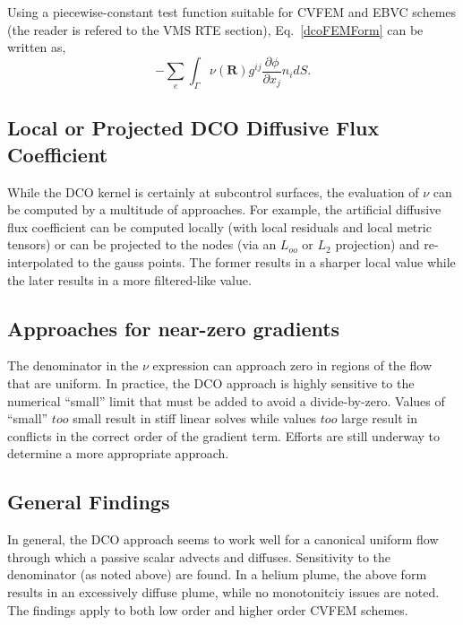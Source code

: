 Using a piecewise-constant test function suitable for CVFEM and EBVC schemes (the reader is refered to the VMS RTE section), 
Eq.~\ref{dcoFEMForm} can be written as,
\begin{equation}
  -\sum_e \int_\Gamma \nu(\mathbf{R}) g^{ij} \frac{\partial \phi} {\partial x_j} n_i dS.
\label{dcoFVForm}
\end{equation}

\subsection{Local or Projected DCO Diffusive Flux Coefficient}
While the DCO kernel is certainly at subcontrol surfaces, the evaluation of $\nu$ can be computed by a multitude of
approaches. For example, the artificial diffusive flux coefficient can be computed locally (with local residuals and local metric tensors)
or can be projected to the nodes (via an $L_{oo}$ or $L_2$ projection) and re-interpolated to the gauss points. The former results 
in a sharper local value while the later results in a more filtered-like value.

\subsection{Approaches for near-zero gradients}
The denominator in the $\nu$ expression can approach zero in regions of the flow that are uniform. In practice, the DCO approach
is highly sensitive to the numerical ``small'' limit that must be added to avoid a divide-by-zero. Values of ``small'' $too$ small
result in stiff linear solves while values $too$ large result in conflicts in the correct order of the gradient term. Efforts
are still underway to determine a more appropriate approach.

\subsection{General Findings}
In general, the DCO approach seems to work well for a canonical uniform flow through which a passive scalar advects and diffuses.
Sensitivity to the denominator (as noted above) are found. In a helium plume, the above form results in an excessively diffuse
plume, while no monotonitciy issues are noted. The findings apply to both low order and higher order CVFEM schemes.

